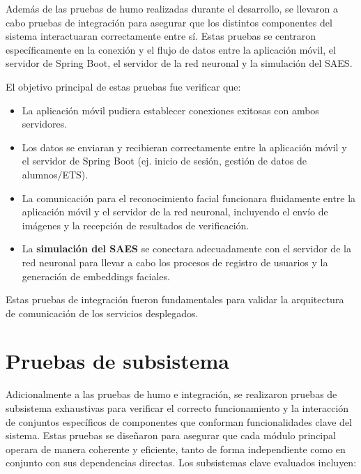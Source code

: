 Además de las pruebas de humo realizadas durante el desarrollo, se llevaron a cabo pruebas de integración para asegurar que los distintos componentes del sistema interactuaran correctamente entre sí. Estas pruebas se centraron específicamente en la conexión y el flujo de datos entre la aplicación móvil, el servidor de Spring Boot, el servidor de la red neuronal y la simulación del SAES.

El objetivo principal de estas pruebas fue verificar que:
\begin{itemize}
	\item La aplicación móvil pudiera establecer conexiones exitosas con ambos servidores.
	\item Los datos se enviaran y recibieran correctamente entre la aplicación móvil y el servidor de Spring Boot (ej. inicio de sesión, gestión de datos de alumnos/ETS).
	\item La comunicación para el reconocimiento facial funcionara fluidamente entre la aplicación móvil y el servidor de la red neuronal, incluyendo el envío de imágenes y la recepción de resultados de verificación.
	\item La \textbf{simulación del SAES} se conectara adecuadamente con el servidor de la red neuronal para llevar a cabo los procesos de registro de usuarios y la generación de embeddings faciales.
\end{itemize}
Estas pruebas de integración fueron fundamentales para validar la arquitectura de comunicación de los servicios desplegados.

\section{Pruebas de subsistema}

Adicionalmente a las pruebas de humo e integración, se realizaron pruebas de subsistema exhaustivas para verificar el correcto funcionamiento y la interacción de conjuntos específicos de componentes que conforman funcionalidades clave del sistema. Estas pruebas se diseñaron para asegurar que cada módulo principal operara de manera coherente y eficiente, tanto de forma independiente como en conjunto con sus dependencias directas. Los subsistemas clave evaluados incluyen:

